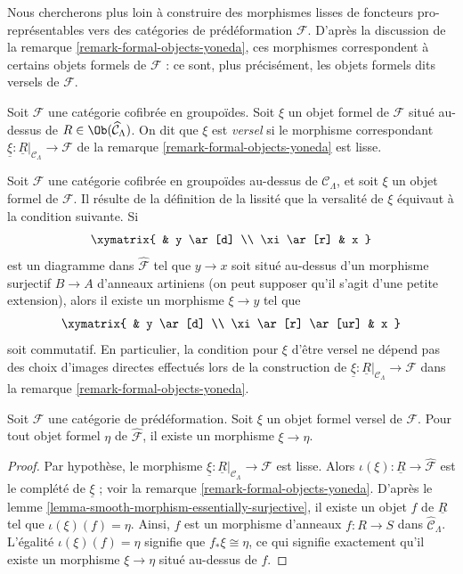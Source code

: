 \noindent
Nous chercherons plus loin à construire des morphismes lisses de foncteurs
pro-représentables vers des catégories de prédéformation $\mathcal{F}$.
D'après la discussion de la remarque \ref{remark-formal-objects-yoneda}, ces
morphismes correspondent à certains objets formels de $\mathcal{F}$ : ce
sont, plus précisément, les objets formels dits versels de $\mathcal{F}$.

\begin{definition}
\label{definition-versal}
Soit $\mathcal{F}$ une catégorie cofibrée en groupoïdes. Soit $\xi$ un objet
formel de $\mathcal{F}$ situé au-dessus de
$R \in \Ob(\widehat{\mathcal{C}}_\Lambda)$. On dit que $\xi$ est {\it versel}
si le morphisme correspondant
$\underline{\xi}: \underline{R}|_{\mathcal{C}_\Lambda} \to \mathcal{F}$
de la remarque \ref{remark-formal-objects-yoneda} est lisse.
\end{definition}

\begin{remark}
\label{remark-versal-object}
Soit $\mathcal{F}$ une catégorie cofibrée en groupoïdes au-dessus de $\mathcal
C_\Lambda$, et soit $\xi$ un objet formel de $\mathcal{F}$. Il
résulte de la définition de la lissité que la versalité de $\xi$ équivaut à la
condition suivante. Si
$$
\xymatrix{
& y \ar[d] \\
\xi \ar[r] & x
}
$$
est un diagramme dans $\widehat{\mathcal{F}}$ tel que $y \to x$ soit situé
au-dessus d'un morphisme surjectif $B \to A$ d'anneaux artiniens (on peut
supposer qu'il s'agit d'une petite extension), alors il existe un morphisme
$\xi \to y$ tel que
$$
\xymatrix{
& y \ar[d] \\
\xi \ar[r] \ar[ur] & x
}
$$
soit commutatif. En particulier, la condition pour $\xi$ d'être versel ne
dépend pas des choix d'images directes effectués lors de la construction de
$\underline{\xi} : \underline{R}|_{\mathcal{C}_\Lambda} \to \mathcal{F}$
dans la remarque \ref{remark-formal-objects-yoneda}.
\end{remark}

\begin{lemma}
\label{lemma-versal-object-quasi-initial}
Soit $\mathcal{F}$ une catégorie de prédéformation. Soit $\xi$ un objet
formel versel de $\mathcal{F}$. Pour tout objet formel $\eta$ de
$\widehat{\mathcal{F}}$, il existe un morphisme $\xi \to \eta$.
\end{lemma}

\begin{proof}
Par hypothèse, le morphisme
$\underline{\xi} : \underline{R}|_{\mathcal{C}_\Lambda} \to \mathcal{F}$
est lisse. Alors
$\iota(\xi) : \underline{R} \to \widehat{\mathcal{F}}$
est le complété de $\underline{\xi}$ ; voir la remarque
\ref{remark-formal-objects-yoneda}. D'après le lemme
\ref{lemma-smooth-morphism-essentially-surjective}, il existe un objet $f$ de
$\underline{R}$ tel que $\iota(\xi)(f) = \eta$. Ainsi, $f$ est un morphisme
d'anneaux $f : R \to S$ dans $\widehat{\mathcal{C}}_\Lambda$. L'égalité
$\iota(\xi)(f) = \eta$ signifie que $f_*\xi \cong \eta$, ce qui signifie
exactement qu'il existe un morphisme $\xi \to \eta$ situé au-dessus de $f$.
\end{proof}





